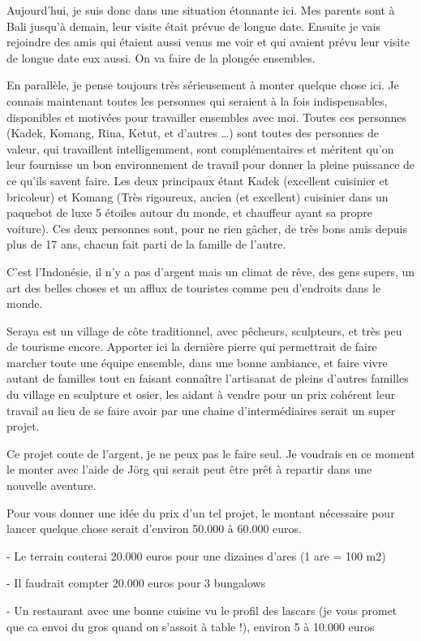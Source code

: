 Aujourd’hui, je suis donc dans une situation étonnante ici. Mes parents sont à Bali jusqu’à demain, leur visite était prévue de longue date. Ensuite je vais rejoindre des amis qui étaient aussi venus me voir et qui avaient prévu leur visite de longue date eux aussi. On va faire de la plongée ensembles.

En parallèle, je pense toujours très sérieusement à monter quelque chose ici. Je connais maintenant toutes les personnes qui seraient à la fois indispensables, disponibles et motivées pour travailler ensembles avec moi. Toutes ces personnes (Kadek, Komang, Rina, Ketut, et d’autres …) sont toutes des personnes de valeur, qui travaillent intelligemment, sont complémentaires et méritent qu’on leur fournisse un bon environnement de travail pour donner la pleine puissance de ce qu’ils savent faire. Les deux principaux étant Kadek (excellent cuisinier et bricoleur) et Komang (Très rigoureux, ancien (et excellent) cuisinier dans un paquebot de luxe 5 étoiles autour du monde, et chauffeur ayant sa propre voiture). Ces deux personnes sont, pour ne rien gâcher, de très bons amis depuis plus de 17 ans, chacun fait parti de la famille de l’autre.

C’est l’Indonésie, il n’y a pas d’argent mais un climat de rêve, des gens supers, un art des belles choses et un afflux de touristes comme peu d’endroits dans le monde.

Seraya est un village de côte traditionnel, avec pêcheurs, sculpteurs, et très peu de tourisme encore. Apporter ici la dernière pierre qui permettrait de faire marcher toute une équipe ensemble, dans une bonne ambiance, et faire vivre autant de familles tout en faisant connaître l’artisanat de pleins d’autres familles du village en sculpture et osier, les aidant à vendre pour un prix cohérent leur travail au lieu de se faire avoir par une chaine d’intermédiaires serait un super projet.

Ce projet coute de l’argent, je ne peux pas le faire seul. Je voudrais en ce moment le monter avec l’aide de Jörg qui serait peut être prêt à repartir dans une nouvelle aventure.

Pour vous donner une idée du prix d’un tel projet, le montant nécessaire pour lancer quelque chose serait d’environ 50.000 à 60.000 euros.

- Le terrain couterai 20.000 euros pour une dizaines d’ares (1 are = 100 m2)

- Il faudrait compter 20.000 euros pour 3 bungalows

- Un restaurant avec une bonne cuisine vu le profil des lascars (je vous promet que ca envoi du gros quand on s’assoit à table !), environ 5 à 10.000 euros

